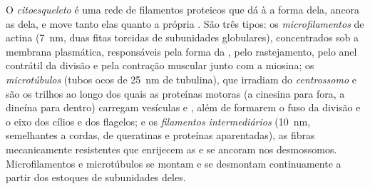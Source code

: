 \begin{definition}[Citoesqueleto]\label{def:b1:eukaryotic-cell:cytoskeleton}
O \emph{citoesqueleto} é uma rede de filamentos
proteicos que dá à  a forma dela, ancora as  dela, e move
tanto elas quanto a própria . São três tipos: os
\emph{microfilamentos} de actina (\qty{7}{nm},
duas fitas torcidas de subunidades globulares), concentrados sob a
membrana plasmática, responsáveis pela forma da , pelo
rastejamento, pelo anel contrátil da divisão e pela contração muscular
junto com a miosina; os \emph{microtúbulos} (tubos
ocos de \qty{25}{nm} de tubulina), que irradiam do
\emph{centrossomo} e são os trilhos ao longo dos
quais as proteínas motoras (a cinesina para fora, a dineína para dentro)
carregam vesículas e , além de formarem o fuso da divisão e o
eixo dos cílios e dos flagelos; e os
\emph{filamentos intermediários}
(\qty{10}{nm}, semelhantes a cordas, de queratinas e proteínas
aparentadas), as fibras mecanicamente resistentes que enrijecem as
 e se ancoram nos desmossomos. Microfilamentos e microtúbulos se
montam e se desmontam continuamente a partir dos estoques de subunidades
deles.
\end{definition}

